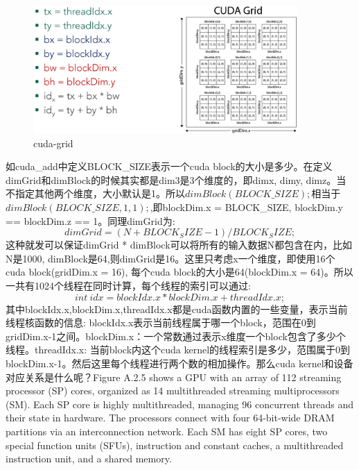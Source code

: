 \documentclass[12pt]{book}
\begin{document}
\begin{figure}[H]
	\centering
	\includegraphics[width=0.9\textwidth]{images/cuda_grid_block.png}
	\caption{cuda-grid}
	\label{cuda-grid}
\end{figure}
如cuda\_add中定义BLOCK\_SIZE表示一个cuda block的大小是多少。在定义dimGrid和dimBlock的时候其实都是dim3是3个维度的，即dimx, dimy, dimz。当不指定其他两个维度，大小默认是1。所以$ dimBlock(BLOCK\_SIZE);$相当于$dimBlock(BLOCK\_SIZE, 1, 1);$,即blockDim.x = BLOCK\_SIZE, blockDim.y == blockDim.z == 1。同理dimGrid为:
\begin{equation}\label{compute-dim-grid}
dimGrid = (N + BLOCK_SIZE - 1) / BLOCK_SIZE;
\end{equation}
这种就发可以保证dimGrid * dimBlock可以将所有的输入数据N都包含在内，比如N是1000, dimBlock是64,则dimGrid是16。这里只考虑x一个维度，即使用16个cuda block(gridDim.x = 16), 每个cuda block的大小是64(blockDim.x = 64)。所以一共有1024个线程在同时计算，每个线程的索引可以通过:
\begin{equation}\label{compute-cuda-thread-idx}
int\ idx = blockIdx.x * blockDim.x + threadIdx.x;
\end{equation}
其中blockIdx.x,blockDim.x,threadIdx.x都是cuda函数内置的一些变量，表示当前线程核函数的信息: blockIdx.x表示当前线程属于哪一个block，范围在0到gridDim.x-1之间。blockDim.x：一个常数通过表示x维度一个block包含了多少个线程。threadIdx.x: 当前block内这个cuda kernel的线程索引是多少，范围属于0到blockDim.x-1。然后这里每个线程进行两个数的相加操作。那么cuda kernel和设备对应关系是什么呢？Figure A.2.5 shows a GPU with an array of
112 streaming processor (SP) cores, organized as 14 multithreaded streaming
multiprocessors (SM). Each SP core is highly multithreaded, managing 96
concurrent threads and their state in hardware. The processors connect with
four 64-bit-wide DRAM partitions via an interconnection network. Each SM
has eight SP cores, two special function units (SFUs), instruction and constant
caches, a multithreaded instruction unit, and a shared memory. 
\end{document}
